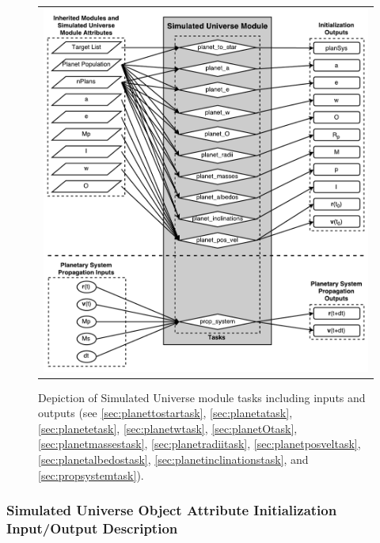 \documentclass[cleanfoot]{asme2ej}
\begin{document}
\begin{figure}[ht]
    \begin{center}
        \begin{tabular}{c}
             \includegraphics[width=\textwidth]{SimulatedUniverseTasks}
        \end{tabular}
    \end{center}
    \caption{\label{fig:simulateduniversemodule} Depiction of Simulated Universe module tasks including inputs and outputs (see \ref{sec:planettostartask}, \ref{sec:planetatask}, \ref{sec:planetetask}, \ref{sec:planetwtask}, \ref{sec:planetOtask}, \ref{sec:planetmassestask}, \ref{sec:planetradiitask}, \ref{sec:planetposveltask}, \ref{sec:planetalbedostask}, \ref{sec:planetinclinationstask}, and \ref{sec:propsystemtask}).}
\end{figure}

\subsubsection{Simulated Universe Object Attribute Initialization Input/Output Description}
\end{document}

